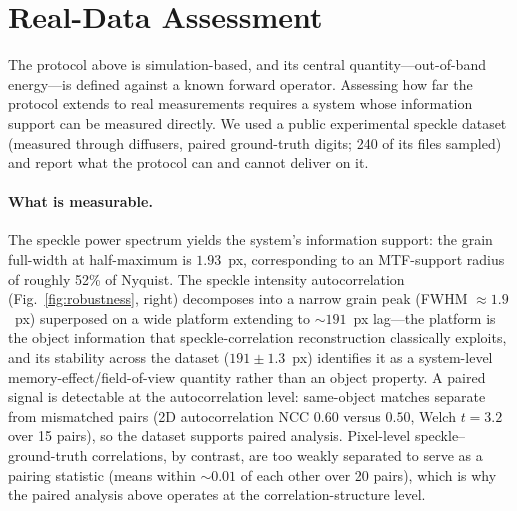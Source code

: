 \section{Real-Data Assessment}
\label{sec:realdata}

The protocol above is simulation-based, and its central quantity---out-of-band energy---is defined against a known forward operator. Assessing how far the protocol extends to real measurements requires a system whose information support can be measured directly. We used a public experimental speckle dataset (measured through diffusers, paired ground-truth digits; 240 of its files sampled) and report what the protocol can and cannot deliver on it.

\paragraph{What is measurable.} The speckle power spectrum yields the system's information support: the grain full-width at half-maximum is $1.93$~px, corresponding to an MTF-support radius of roughly 52\% of Nyquist. The speckle intensity autocorrelation (Fig.~\ref{fig:robustness}, right) decomposes into a narrow grain peak (FWHM $\approx 1.9$~px) superposed on a wide platform extending to $\sim$$191$~px lag---the platform is the object information that speckle-correlation reconstruction classically exploits, and its stability across the dataset ($191 \pm 1.3$~px) identifies it as a system-level memory-effect/field-of-view quantity rather than an object property. A paired signal is detectable at the autocorrelation level: same-object matches separate from mismatched pairs (2D autocorrelation NCC $0.60$ versus $0.50$, Welch $t = 3.2$ over 15 pairs), so the dataset supports paired analysis. Pixel-level speckle--ground-truth correlations, by contrast, are too weakly separated to serve as a pairing statistic (means within ${\sim}0.01$ of each other over 20 pairs), which is why the paired analysis above operates at the correlation-structure level.

